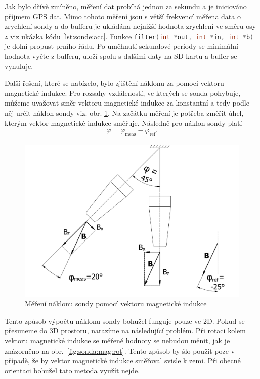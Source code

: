 \documentclass[twoside]{ctuthesis}
\theoremstyle{plain}
\theoremstyle{definition}
\theoremstyle{note}
\begin{document}
		Jak bylo dřívě zmíněno, měření dat probíhá jednou za sekundu a je iniciováno příjmem GPS dat. Mimo tohoto měření jsou s větší frekvencí měřena data o zrychlení sondy a do bufferu je ukládána nejnižší hodnota zrychlení ve směru osy $z$ viz ukázka kódu \ref{lst:sonde:acc}. Funkce \lstinline[language=C]|filter(int *out, int *in, int *b)| je dolní propust prního řádu. Po uměhnutí sekundové periody se minimální hodnota vyčte z bufferu, uloží spolu s dalšími daty na SD kartu a buffer se vynuluje.
			


		Další řešení, které se nabízelo, bylo zjištění náklonu za pomoci vektoru magnetické indukce. Pro rozsahy vzdáleností, ve kterých se sonda pohybuje, můžeme uvažovat směr vektoru magnetické indukce za konstantní a tedy podle něj určit náklon sondy viz. obr. \ref{fig:sonda:mag}. Na začátku měření je potřeba změřit úhel, kterým vektor magnetické indukce směřuje. Následně pro náklon sondy platí
		\begin{align}
			\varphi = \varphi_\text{meas} - \varphi_\text{ref}.
		\end{align}

		\begin{figure}[hbtp]
			\centering
			\includegraphics[width=.5\textwidth]{Figures/sonda_naklon_mag.pdf}
			\caption{Měření náklonu sondy pomocí vektoru magnetické indukce}
			\label{fig:sonda:mag}
		\end{figure}

		Tento způsob výpočtu náklonu sondy bohužel funguje pouze ve 2D. Pokud se přesuneme do 3D prostoru, narazíme na následující problém. Při rotaci kolem vektoru magnetické indukce se měřené hodnoty se nebudou měnit, jak je znázorněno na obr.~\ref{fig:sonda:mag:rot}. Tento způsob by šlo použít poze v případě, že by vektor magnetické indukce směřoval svisle k zemi. Při obecné orientaci bohužel tato metoda využít nejde.
\end{document}
